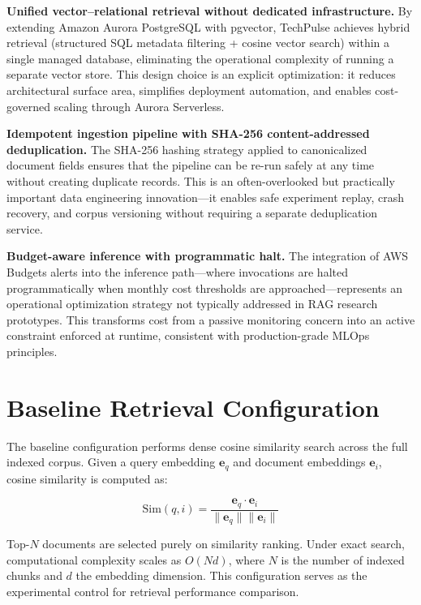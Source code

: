\documentclass[12pt,a4paper]{report}
\begin{document}
\textbf{Unified vector--relational retrieval without dedicated infrastructure.} By extending Amazon Aurora PostgreSQL with pgvector, TechPulse achieves hybrid retrieval (structured SQL metadata filtering + cosine vector search) within a single managed database, eliminating the operational complexity of running a separate vector store. This design choice is an explicit optimization: it reduces architectural surface area, simplifies deployment automation, and enables cost-governed scaling through Aurora Serverless.

\textbf{Idempotent ingestion pipeline with SHA-256 content-addressed deduplication.} The SHA-256 hashing strategy applied to canonicalized document fields ensures that the pipeline can be re-run safely at any time without creating duplicate records. This is an often-overlooked but practically important data engineering innovation—it enables safe experiment replay, crash recovery, and corpus versioning without requiring a separate deduplication service.

\textbf{Budget-aware inference with programmatic halt.} The integration of AWS Budgets alerts into the inference path—where invocations are halted programmatically when monthly cost thresholds are approached—represents an operational optimization strategy not typically addressed in RAG research prototypes. This transforms cost from a passive monitoring concern into an active constraint enforced at runtime, consistent with production-grade MLOps principles.

\section{Baseline Retrieval Configuration}
\label{sec:baseline}

The baseline configuration performs dense cosine similarity search across the full indexed corpus. Given a query embedding $\mathbf{e}_q$ and document embeddings $\mathbf{e}_i$, cosine similarity is computed as:

\begin{equation}
  \text{Sim}(q, i) = \frac{\mathbf{e}_q \cdot \mathbf{e}_i}{\|\mathbf{e}_q\|\|\mathbf{e}_i\|}
  \label{eq:cosine}
\end{equation}

Top-$N$ documents are selected purely on similarity ranking. Under exact search, computational complexity scales as $O(Nd)$, where $N$ is the number of indexed chunks and $d$ the embedding dimension. This configuration serves as the experimental control for retrieval performance comparison.
\end{document}

